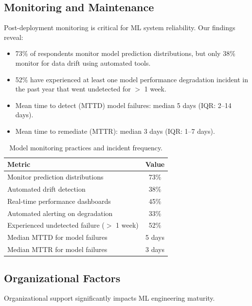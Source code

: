 \documentclass[
    language=english,
    doctype=survey-report,
    institution=none,
]{../../omnilatex}
\begin{document}
\subsection{Monitoring and Maintenance}

Post-deployment monitoring is critical for ML system reliability. Our
findings reveal:

\begin{itemize}
    \item 73\% of respondents monitor model prediction distributions,
          but only 38\% monitor for data drift using automated tools.
    \item 52\% have experienced at least one model performance degradation
          incident in the past year that went undetected for $>$ 1 week.
    \item Mean time to detect (MTTD) model failures: median 5 days
          (IQR: 2--14 days).
    \item Mean time to remediate (MTTR): median 3 days (IQR: 1--7 days).
\end{itemize}

\begin{table}[htbp]
    \centering
    \caption{Model monitoring practices and incident frequency.}
    \label{tab:monitoring}
    \begin{tabular}{@{}lc@{}}
        \toprule
        Metric & Value \\
        \midrule
        Monitor prediction distributions & 73\% \\
        Automated drift detection & 38\% \\
        Real-time performance dashboards & 45\% \\
        Automated alerting on degradation & 33\% \\
        Experienced undetected failure ($>$ 1 week) & 52\% \\
        Median MTTD for model failures & 5 days \\
        Median MTTR for model failures & 3 days \\
        \bottomrule
    \end{tabular}
\end{table}

\subsection{Organizational Factors}

Organizational support significantly impacts ML engineering maturity.
\end{document}
